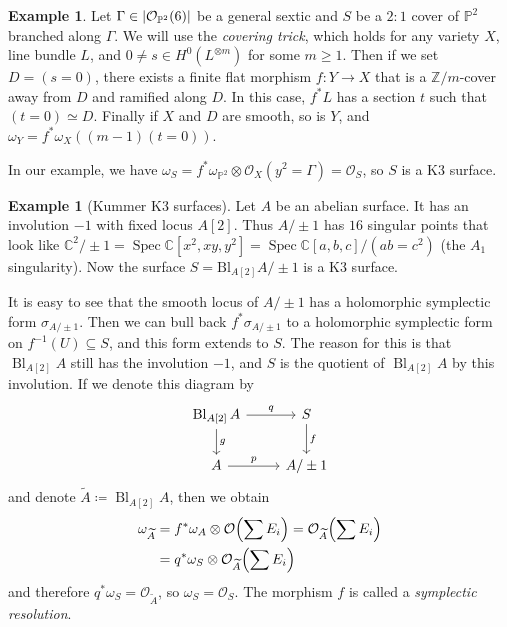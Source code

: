 \documentclass[leqno, openany]{memoir}
\theoremstyle{definition}
\newtheorem{exm}[thm]{Example}
\theoremstyle{remark}
\theoremstyle{plain}
\theoremstyle{definition}
\theoremstyle{remark}
\newcommand{\C}{\mathbb{C}}
\newcommand{\Z}{\mathbb{Z}}
\renewcommand{\P}{\mathbb{P}}
\newcommand{\mc}[1]{\mathcal{#1}}
\newcommand{\mr}[1]{\mathrm{#1}}
\newcommand{\wt}[1]{\widetilde{#1}}
\DeclareMathOperator{\Spec}{Spec}
\DeclareMathOperator{\Bl}{Bl}
\begin{document}
\begin{exm}
    Let $\Gamma \in \abs{\mc{O}_{\P^2}(6)}$ be a general sextic and $S$ be a $2:1$ cover of $\P^2$ branched along $\Gamma$. We will use the \textit{covering trick}, which holds for any variety $X$, line bundle $L$, and $0 \neq s \in H^0(L^{\otimes m})$ for some $m \geq 1$. Then if we set $D = (s = 0)$, there exists a finite flat morphism $f \colon Y \to X$ that is a $\Z/m$-cover away from $D$ and ramified along $D$. In this case, $f^* L$ has a section $t$ such that $(t=0) \simeq D$. Finally if $X$ and $D$ are smooth, so is $Y$, and $\omega_Y = f^* \omega_X((m-1) (t=0))$. 

    In our example, we have $\omega_S = f^* \omega_{\P^2} \otimes \mc{O}_X(y^2=\Gamma) = \mc{O}_S$, so $S$ is a K3 surface.
\end{exm}

\begin{exm}[Kummer K3 surfaces]
    Let $A$ be an abelian surface. It has an involution $-1$ with fixed locus $A[2]$. Thus $A/\pm 1$ has $16$ singular points that look like $\C^2/\pm 1 = \Spec \C[x^2, xy, y^2] = \Spec \C[a,b,c]/(ab=c^2)$ (the $A_1$ singularity). Now the surface $S = \mr{Bl}_{A[2]} A/\pm 1$ is a K3 surface.

    It is easy to see that the smooth locus of $A/\pm 1$ has a holomorphic symplectic form $\sigma_{A/\pm 1}$. Then we can bull back $f^* \sigma_{A/\pm 1}$ to a holomorphic symplectic form on $f^{-1}(U) \subseteq S$, and this form extends to $S$. The reason for this is that $\Bl_{A[2]} A$ still has the involution $-1$, and $S$ is the quotient of $\Bl_{A[2]} A$ by this involution. If we denote this diagram by
    \begin{equation}
    \begin{tikzcd}
        \Bl_{A[2]} A \arrow{r}{q} \ar{d}{g} & S \ar{d}{f} \\
        A \arrow{r}{p} & A/\pm 1
    \end{tikzcd}
    \end{equation}
    and denote $\wt{A} \coloneqq \Bl_{A[2]} A$, then we obtain
    \begin{align*} 
        \omega_{\wt{A}} &= f^* \omega_A \otimes \mc{O}\qty(\sum E_i) = \mc{O}_{\wt{A}}\qty(\sum E_i) \\
                        &= q^* \omega_S \otimes \mc{O}_{\wt{A}}\qty(\sum E_i) 
    \end{align*}
    and therefore $q^* \omega_S = \mc{O}_{\wt{A}}$, so $\omega_S = \mc{O}_S$. The morphism $f$ is called a \textit{symplectic resolution}. 
\end{exm}
\end{document}
